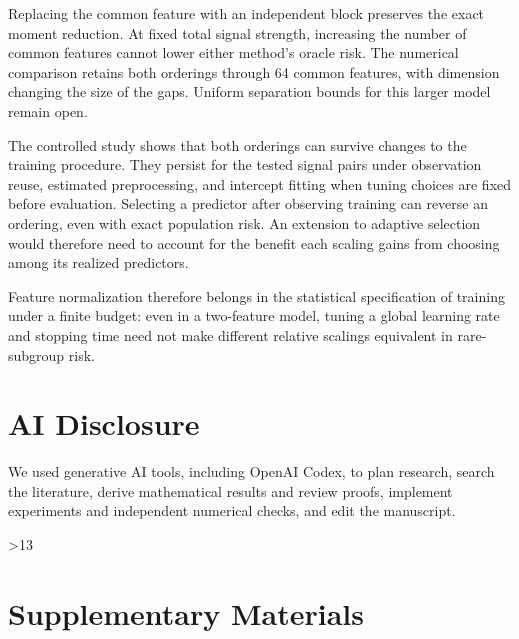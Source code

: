 \documentclass{alt2027}
\begin{document}
Replacing the common feature with an independent block preserves the exact
moment reduction. At fixed total signal strength, increasing the number of
common features cannot lower either method's oracle risk. The numerical
comparison retains both orderings through 64 common features, with dimension
changing the size of the gaps. Uniform separation bounds for this larger model
remain open.

The controlled study shows that both orderings can survive changes to the
training procedure. They persist for the tested signal pairs under observation
reuse, estimated preprocessing, and intercept fitting when tuning choices are
fixed before evaluation. Selecting a predictor after observing training can
reverse an ordering, even with exact population risk. An extension to adaptive
selection would therefore need to account for the benefit each scaling gains
from choosing among its realized predictors.

Feature normalization therefore belongs in the statistical specification of
training under a finite budget: even in a two-feature model, tuning a global
learning rate and stopping time need not make different relative scalings
equivalent in rare-subgroup risk.

\section*{AI Disclosure}

We used generative AI tools, including OpenAI Codex, to plan research, search
the literature, derive mathematical results and review proofs, implement
experiments and independent numerical checks, and edit the manuscript.

\clearpage
{}
\ifnum\value{page}>13
\fi



\clearpage

\appendix
{}

\section*{Supplementary Materials}
\end{document}
